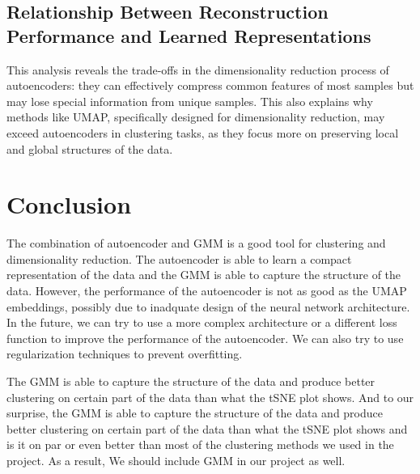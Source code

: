 \documentclass{article}
\begin{document}
\subsection*{Relationship Between Reconstruction Performance and Learned Representations}


This analysis reveals the trade-offs in the dimensionality reduction process of autoencoders: they can effectively compress common features of most samples but may lose special information from unique samples. This also explains why methods like UMAP, specifically designed for dimensionality reduction, may exceed autoencoders in clustering tasks, as they focus more on preserving local and global structures of the data.

\section*{Conclusion}

The combination of autoencoder and GMM is a good tool for clustering and dimensionality reduction. The autoencoder is able to learn a compact representation of the data and the GMM is able to capture the structure of the data. However, the performance of the autoencoder is not as good as the UMAP embeddings, possibly due to inadquate design of the neural network architecture. In the future, we can try to use a more complex architecture or a different loss function to improve the performance of the autoencoder. We can also try to use regularization techniques to prevent overfitting. 

The GMM is able to capture the structure of the data and produce better clustering on certain part of the data than what the tSNE plot shows. And to our surprise, the GMM is able to capture the structure of the data and produce better clustering on certain part of the data than what the tSNE plot shows and is it on par or even better than most of the clustering methods we used in the project. As a result, We should include GMM in our project as well.

\newpage


\end{document}

